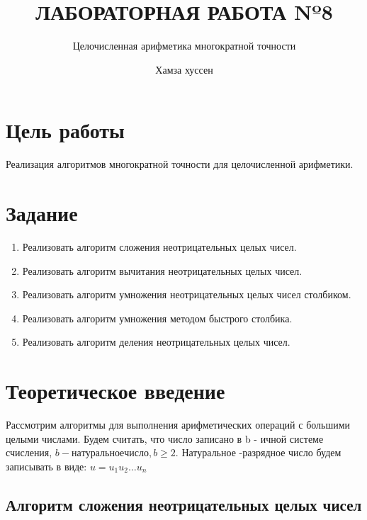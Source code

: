 \documentclass[
  english,
  russian,
  12pt,
  a4paper,
  DIV=11,
  numbers=noendperiod]{scrreprt}
\title{ЛАБОРАТОРНАЯ РАБОТА Nº8}
\subtitle{Целочисленная арифметика многократной точности}
\author{Хамза хуссен}
\date{}
\renewcommand*\contentsname{Содержание}
\newcommand\contentsname{Содержание}
\begin{document}
\maketitle

\renewcommand*\contentsname{Содержание}
{
\setcounter{tocdepth}{1}
\tableofcontents
}

\chapter{Цель
работы}\label{ux446ux435ux43bux44c-ux440ux430ux431ux43eux442ux44b}

Реализация алгоритмов многократной точности для целочисленной
арифметики.

\chapter{Задание}\label{ux437ux430ux434ux430ux43dux438ux435}

\begin{enumerate}
\def\labelenumi{\arabic{enumi}.}
\item
  Реализовать алгоритм сложения неотрицательных целых чисел.
\item
  Реализовать алгоритм вычитания неотрицательных целых чисел.
\item
  Реализовать алгоритм умножения неотрицательных целых чисел столбиком.
\item
  Реализовать алгоритм умножения методом быстрого столбика.
\item
  Реализовать алгоритм деления неотрицательных целых чисел.
\end{enumerate}

\chapter{Теоретическое
введение}\label{ux442ux435ux43eux440ux435ux442ux438ux447ux435ux441ux43aux43eux435-ux432ux432ux435ux434ux435ux43dux438ux435}

Рассмотрим алгоритмы для выполнения арифметических операций с большими
целыми числами. Будем считать, что число записано в b - ичной системе
счисления, \(b - натуральное число, b ≥ 2\). Натуральное -разрядное
число будем записывать в виде: \(u = u_1 u_2 \ldots u_n\)

\section{Алгоритм сложения неотрицательных целых
чисел}\label{ux430ux43bux433ux43eux440ux438ux442ux43c-ux441ux43bux43eux436ux435ux43dux438ux44f-ux43dux435ux43eux442ux440ux438ux446ux430ux442ux435ux43bux44cux43dux44bux445-ux446ux435ux43bux44bux445-ux447ux438ux441ux435ux43b}
\end{document}
